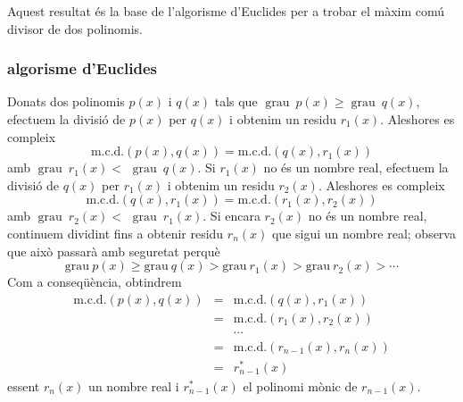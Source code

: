 Aquest resultat és la base de l'algorisme d'Euclides per a trobar el màxim comú divisor de dos polinomis.

\subsubsection{algorisme d’Euclides}

Donats dos polinomis $p(x)$ i $q(x)$ tals que $\operatorname{grau}~p(x)\geq $$\operatorname{grau}~q(x)$,
efectuem la divisió de $p(x)$ per $q(x)$ i obtenim un residu $r_{1}(x) $. Aleshores es compleix\begin{equation*}
\text{m.c.d.}\left( p(x),q(x)\right) =\text{m.c.d.}\left(
q(x),r_{1}(x)\right)
\end{equation*}amb $\operatorname{grau}~r_{1}(x)<$ $\operatorname{grau}~q(x)$. Si $r_{1}(x)$ no és un nombre real,
efectuem la divisió de $q(x)$ per $r_{1}(x)$ i obtenim un residu $r_{2}(x)$. Aleshores es compleix\begin{equation*}
\text{m.c.d.}\left( q(x),r_{1}(x)\right) =\text{m.c.d.}\left(
r_{1}(x),r_{2}(x)\right)
\end{equation*}amb $\operatorname{grau}~r_{2}(x)<$ $\operatorname{grau}~r_{1}(x)$. Si encara $r_{2}(x)$ no és un nombre real, continuem dividint fins a obtenir residu $r_{n}(x)$ que
sigui un nombre real; observa que això passarà amb seguretat perquè\begin{equation*}
\text{grau}~p(x)\geq \text{grau}~q(x)>\text{grau}~r_{1}(x)>\text{grau}~r_{2}(x)>\cdots
\end{equation*}Com a conseqüència, obtindrem\begin{eqnarray*}
\text{m.c.d.}\left( p(x),q(x)\right) &=&\text{m.c.d.}\left(
q(x),r_{1}(x)\right) \\
&=&\text{m.c.d.}\left( r_{1}(x),r_{2}(x)\right) \\
&&\cdots \\
&=&\text{m.c.d.}\left( r_{n-1}(x),r_{n}(x)\right) \\
&=&r_{n-1}^{\ast }(x)
\end{eqnarray*}essent $r_{n}(x)$ un nombre real i $r_{n-1}^{\ast }(x)$ el polinomi mònic de $r_{n-1}(x)$.

